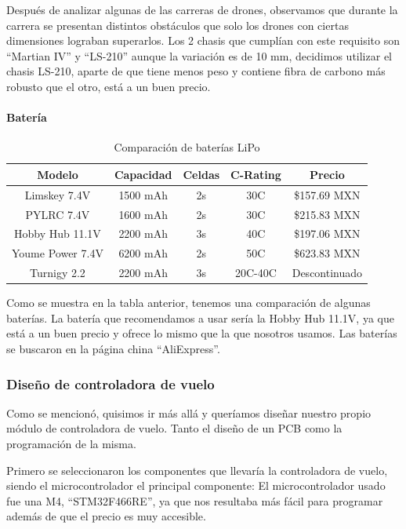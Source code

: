 \documentclass[pdflatex,sn-mathphys-num]{sn-jnl}%
\begin{document}
Después de analizar algunas de las carreras de drones, observamos que durante la carrera se presentan distintos obstáculos que solo los drones con ciertas dimensiones lograban superarlos. Los 2 chasis que cumplían con este requisito son ``Martian IV'' y ``LS-210'' aunque la variación es de 10 mm, decidimos utilizar el chasis LS-210, aparte de que tiene menos peso y contiene fibra de carbono más robusto que el otro, está a un buen precio.

\paragraph{Batería}

\begin{table}[!h]
\centering
\caption{Comparación de baterías LiPo}
\label{tab:battery_comparison}
\begin{tabular}{|c|c|c|c|c|}
\hline
\textbf{Modelo} & \textbf{Capacidad} & \textbf{Celdas} & \textbf{C-Rating} & \textbf{Precio} \\
\hline
Limskey 7.4V & 1500 mAh & 2s & 30C & \$157.69 MXN \\
\hline
PYLRC 7.4V & 1600 mAh & 2s & 30C & \$215.83 MXN \\
\hline
Hobby Hub 11.1V & 2200 mAh & 3s & 40C & \$197.06 MXN \\
\hline
Youme Power 7.4V & 6200 mAh & 2s & 50C & \$623.83 MXN \\
\hline
Turnigy 2.2 & 2200 mAh & 3s & 20C-40C & Descontinuado \\
\hline
\end{tabular}
\end{table}

Como se muestra en la tabla anterior, tenemos una comparación de algunas baterías. La batería que recomendamos a usar sería la Hobby Hub 11.1V, ya que está a un buen precio y ofrece lo mismo que la que nosotros usamos. Las baterías se buscaron en la página china ``AliExpress''.

\subsubsection{Diseño de controladora de vuelo}

Como se mencionó, quisimos ir más allá y queríamos diseñar nuestro propio módulo de controladora de vuelo. Tanto el diseño de un PCB como la programación de la misma.

Primero se seleccionaron los componentes que llevaría la controladora de vuelo, siendo el microcontrolador el principal componente: El microcontrolador usado fue una M4, ``STM32F466RE'', ya que nos resultaba más fácil para programar además de que el precio es muy accesible.
\end{document}
